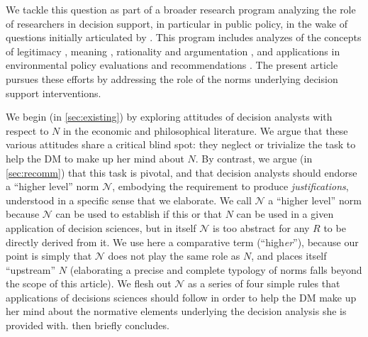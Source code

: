 \documentclass[preprint, french, english, 11pt, authoryear]{elsarticle}%
\newcommand{\adv}{\mathscr{N}}
\begin{document}
\begin{changebar}
We tackle this question as part of a broader research program analyzing the role of researchers in decision support, in particular in public policy, in the wake of questions initially articulated by \citet{tsoukias_policy_2013}.
This program includes analyzes of the concepts of legitimacy \citep{meinard_what_2017}, meaning \citep{meinard_utility_2018}, rationality \citep{meinard_rationality_2019} and argumentation \citep{cailloux_formal_2018}, 
and applications in environmental policy evaluations \citep{jeanmougin_mismatch_2017} and recommendations \citep{choulak_meta-decision-analysis_2019}.
The present article pursues these efforts by addressing the role of the norms underlying decision support interventions.\end{changebar}

We begin (in \cref{sec:existing}) by exploring attitudes of decision analysts with respect to $N$ in the economic and philosophical literature. 
We argue that these various attitudes share a critical blind spot: they neglect or trivialize the task to help the \ac{DM} to make up her mind about $N$. 
By contrast, we argue (in \cref{sec:recomm}) that this task is pivotal, and that decision analysts should endorse a “higher level” norm $\adv$, embodying the requirement to produce \emph{justifications}, understood in a specific sense that we elaborate. 
We call $\adv$ a “higher level” norm because $\adv$ can be used to establish if this or that $N$ can be used in a given application of decision sciences, but in itself $\adv$ is too abstract for any $R$ to be directly derived from it.
We use here a comparative term (“high\emph{er}”), because our point is simply that $\adv$ does not play the same role as $N$, and places itself “upstream” $N$ (elaborating a precise and complete typology of norms falls beyond the scope of this article).
We flesh out $\adv$ as a series of four simple rules that applications of decisions sciences should follow in order to help the \ac{DM} make up her mind about the normative elements underlying the decision analysis she is provided with.  then briefly concludes.
\end{document}
